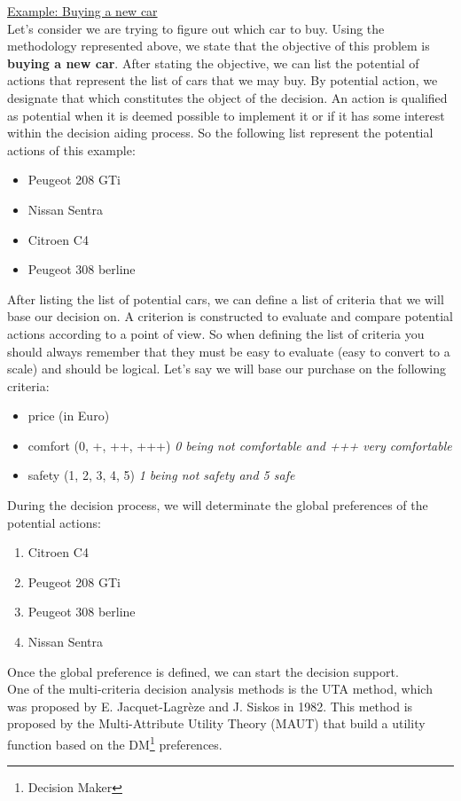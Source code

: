 \documentclass{report}
\begin{document}
\underline{Example: Buying a new car} \\
Let's consider we are trying to figure out which car to buy. Using the methodology represented above, we state that the objective of this problem is \textbf{buying a new car}. After stating the objective, we can list the potential of actions that represent the list of cars that we may buy. By potential action, we designate that which constitutes the object of the decision. An action is qualified as potential when it is deemed possible to implement it or if it has some interest within the decision aiding process. So the following list represent the potential actions of this example: 
\begin{itemize}
\item Peugeot 208 GTi
\item Nissan Sentra
\item Citroen C4
\item Peugeot 308 berline
\end{itemize}
After listing the list of potential cars, we can define a list of criteria that we will base our decision on. A criterion is constructed to evaluate and compare potential actions according to a point of view. So when defining the list of criteria you should always remember that they must be easy to evaluate (easy to convert to a scale) and should be logical.
Let's say we will base our purchase on the following criteria:
\begin{itemize}
\item price (in Euro)
\item comfort (0, +, ++, +++) \textit{0 being not comfortable and +++ very comfortable}
\item safety (1, 2, 3, 4, 5) \textit{1 being not safety and 5 safe}
\end{itemize}
During the decision process, we will determinate the global preferences of the potential actions:
\begin{enumerate}
\item Citroen C4
\item Peugeot 208 GTi
\item Peugeot 308 berline
\item Nissan Sentra
\end{enumerate}
Once the global preference is defined, we can start the decision support.\\

One of the multi-criteria decision analysis methods is the UTA method, which was proposed by E. Jacquet-Lagrèze and J. Siskos in 1982. This method is proposed by the Multi-Attribute Utility Theory (MAUT) that build a utility function based on the DM\footnote{Decision Maker} preferences.\\ 
\end{document}
